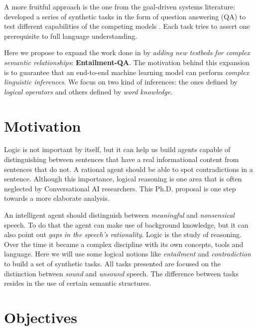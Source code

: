 A more fruitful approach is the one from the goal-driven systems literature: developed a series of synthetic tasks in the form of question answering (QA) to test different capabilities of the competing models \cite{BordesW16, Hixon15, WestonBCM15}. Each task tries to assert one prerequisite to full language understanding.

Here we propose to expand the work done in \cite{BordesW16, WestonBCM15} by \textit{adding new testbeds for complex semantic relationships}: \textbf{Entailment-QA}. The motivation behind this expansion is to guarantee that an end-to-end machine learning model can perform \textit{complex linguistic inferences}. We focus on two kind of inferences: the ones defined by \textit{logical operators} and others defined by \textit{word knowledge}.


\section{Motivation}
\label{sec:motivation}

Logic is not important by itself, but it can help us build agents capable of distinguishing between sentences that have a real informational content from sentences that do not. A rational agent should be able to spot contradictions in a sentence. Although this importance, logical reasoning is one area that is often neglected by Conversational AI researchers. This Ph.D. proposal is one step towards a more elaborate analysis.

An intelligent agent should distinguish between \textit{meaningful} and \textit{nonsensical} speech. To do that the agent can make use of background knowledge, but it can also point out \textit{gaps in the speech's rationality}. Logic is the study of reasoning. Over the time it became a complex discipline with its own concepts, tools and language. Here we will use some logical notions like \textit{entailment} and \textit{contradiction} to build a set of synthetic tasks. All tasks presented are focused on the distinction between \textit{sound} and \textit{unsound} speech. The difference between tasks resides in the use of certain semantic structures.



\section{Objectives}
\label{sec:objectives}

